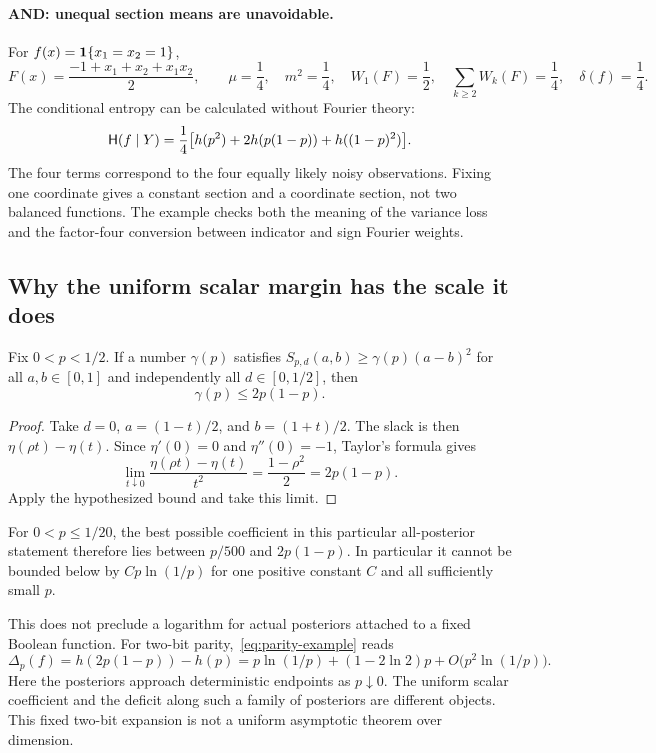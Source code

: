 \paragraph{AND: unequal section means are unavoidable.}
For $f(x)=\mathbf 1\{x_1=x_2=1\}$,
\[
 F(x)=\frac{-1+x_1+x_2+x_1x_2}{2},\qquad
 \mu=\frac14,\quad m^2=\frac14,\quad W_1(F)=\frac12,\quad
 \sum_{k\ge2}W_k(F)=\frac14,\quad\delta(f)=\frac14.
\]
The conditional entropy can be calculated without Fourier theory:
\begin{equation}\label{eq:and-example}
 \mathsf H(f\mid Y)=\frac14\bigl[h(p^2)+2h(p(1-p))+h((1-p)^2)\bigr].
\end{equation}
The four terms correspond to the four equally likely noisy observations. Fixing one coordinate gives a constant section and a coordinate section, not two balanced functions. The example checks both the meaning of the variance loss and the factor-four conversion between indicator and sign Fourier weights.

\subsection{Why the uniform scalar margin has the scale it does}
\begin{proposition}\label{prop:scalar-barrier}
Fix $0<p<1/2$. If a number $\gamma(p)$ satisfies
$S_{p,d}(a,b)\ge\gamma(p)(a-b)^2$ for all $a,b\in[0,1]$ and independently all $d\in[0,1/2]$, then
\begin{equation}\label{eq:scalar-barrier}
 \gamma(p)\le2p(1-p).
\end{equation}
\end{proposition}
\begin{proof}
Take $d=0$, $a=(1-t)/2$, and $b=(1+t)/2$. The slack is then $\eta(\rho t)-\eta(t)$. Since $\eta'(0)=0$ and $\eta''(0)=-1$, Taylor's formula gives
\[
 \lim_{t\downarrow0}\frac{\eta(\rho t)-\eta(t)}{t^2}
 =\frac{1-\rho^2}{2}=2p(1-p).
\]
Apply the hypothesized bound and take this limit.
\end{proof}
For $0<p\le1/20$, the best possible coefficient in this particular all-posterior statement therefore lies between $p/500$ and $2p(1-p)$. In particular it cannot be bounded below by $Cp\ln(1/p)$ for one positive constant $C$ and all sufficiently small $p$.

This does not preclude a logarithm for actual posteriors attached to a fixed Boolean function. For two-bit parity,~\eqref{eq:parity-example} reads
\[
 \Delta_p(f)=h(2p(1-p))-h(p)
 =p\ln(1/p)+(1-2\ln2)p+O\bigl(p^2\ln(1/p)\bigr).
\]
Here the posteriors approach deterministic endpoints as $p\downarrow0$. The uniform scalar coefficient and the deficit along such a family of posteriors are different objects. This fixed two-bit expansion is not a uniform asymptotic theorem over dimension.

